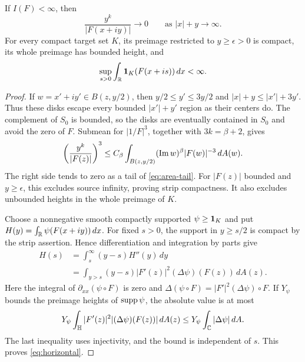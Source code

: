 \begin{lemma}\label{lem:infinity}
If \(I(F)<\infty\), then
\begin{equation}\label{eq:infinity}
 \frac{y^k}{|F(x+iy)|}\longrightarrow0
 \qquad\text{as } |x|+y\longrightarrow\infty.
\end{equation}
For every compact target set \(K\), its preimage restricted to
\(y\ge\epsilon>0\) is compact, its whole preimage has bounded height,
and
\begin{equation}\label{eq:horizontal}
 \sup_{s>0}\int_\mathbb R\mathbf 1_K(F(x+is))\,dx<\infty.
\end{equation}
\end{lemma}
\begin{proof}
If \(w=x'+iy'\in B(z,y/2)\), then \(y/2\le y'\le3y/2\) and
\(|x|+y\le |x'|+3y'\).
Thus these disks escape every bounded \(|x'|+y'\) region as
their centers do. The complement of \(S_0\) is bounded, so
the disks are eventually contained in \(S_0\) and avoid the zero of \(F\).
Submean for \(|1/F|^3\), together with \(3k=\beta+2\), gives
\[
 \left(\frac{y^k}{|F(z)|}\right)^3
 \le C_\beta\int_{B(z,y/2)}
      (\operatorname{Im} w)^\beta|F(w)|^{-3}\,dA(w).
\]
The right side tends to zero as a tail of \eqref{eq:area-tail}.
For \(|F(z)|\) bounded and \(y\ge\epsilon\), this excludes source
infinity, proving strip compactness. It also excludes unbounded
heights in the whole preimage of \(K\).

Choose a nonnegative smooth compactly supported \(\psi\ge\mathbf 1_K\)
and put \(H(y)=\int_\mathbb R\psi(F(x+iy))\,dx\).
For fixed \(s>0\), the support in \(y\ge s/2\) is compact by the
strip assertion. Hence differentiation and integration by parts give
\begin{align*}
 H(s)&=\int_s^\infty(y-s)H''(y)\,dy\\
 &=\int_{y>s}(y-s)|F'(z)|^2(\Delta\psi)(F(z))\,dA(z).
\end{align*}
Here the integral of \(\partial_{xx}(\psi\circ F)\) is zero and
\(\Delta(\psi\circ F)=|F'|^2(\Delta\psi)\circ F\).
If \(Y_\psi\) bounds the preimage heights of \(\operatorname{supp}\psi\), the
absolute value is at most
\[
 Y_\psi\int_\mathbb H |F'(z)|^2|(\Delta\psi)(F(z))|\,dA(z)
 \le Y_\psi\int_\mathbb C|\Delta\psi|\,dA.
\]
The last inequality uses injectivity, and the bound is independent
of \(s\). This proves \eqref{eq:horizontal}.
\end{proof}

